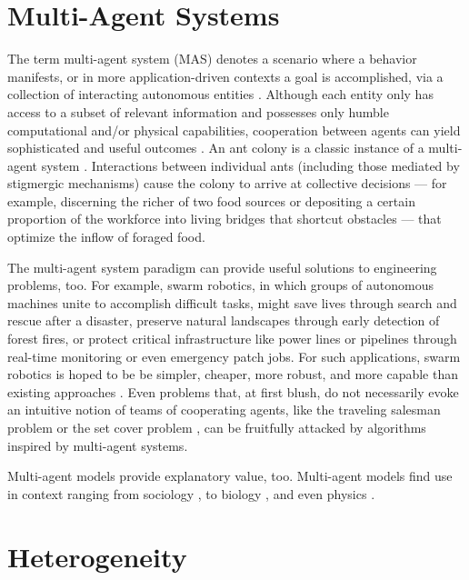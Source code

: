 \section{Multi-Agent Systems}

The term multi-agent system (MAS) denotes a scenario where a behavior manifests, or in more application-driven contexts a goal is accomplished, via a collection of interacting autonomous entities \cite{ferber2003agents}.
Although each entity only has access to a subset of relevant information and possesses only humble computational and/or physical capabilities, cooperation between agents can yield sophisticated and useful outcomes  \cite{panait2005cooperative}.
An ant colony is a classic instance of a multi-agent system \cite{parunak1997go}.
Interactions between individual ants (including those mediated by stigmergic mechanisms) cause the colony to arrive at collective decisions --- for example, discerning the richer of two food sources \cite{beckers1993modulation} or depositing a certain proportion of the workforce into living bridges that shortcut obstacles \cite{graham2017optimal} --- that optimize the inflow of foraged food.

The multi-agent system paradigm can provide useful solutions to engineering problems, too.
For example, swarm robotics, in which groups of autonomous machines unite to accomplish difficult tasks, might save lives through search and rescue after a disaster, preserve natural landscapes through early detection of forest fires, or protect critical infrastructure like power lines or pipelines through real-time monitoring or even emergency patch jobs.
For such applications, swarm robotics is hoped to be be simpler, cheaper, more robust, and more capable than existing approaches \cite{tan2013research}.
Even problems that, at first blush, do not necessarily evoke an intuitive notion of teams of cooperating agents, like the traveling salesman problem \cite{dorigo1997ant, bnasin2013applications} or the set cover problem \cite{rahoual2002parallel,ren2010new}, can be fruitfully attacked by algorithms inspired by multi-agent systems.

Multi-agent models provide explanatory value, too.
Multi-agent models find use in context ranging from sociology \cite{sawyer2003artificial}, to biology \cite{perna2012individual, amigoni2007multiagent}, and even physics \cite{vicsek1995novel}.

\section{Heterogeneity}

